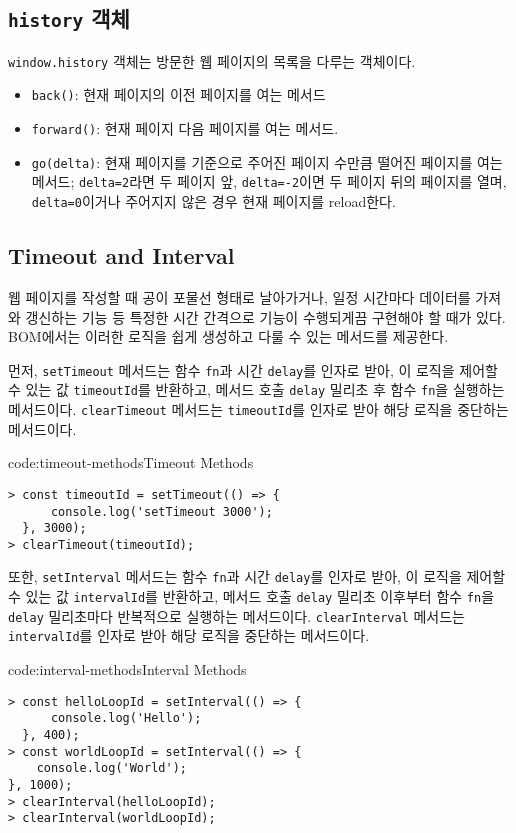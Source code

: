 \subsection*{\texttt{history} 객체}

\texttt{window.history} 객체는 방문한 웹 페이지의 목록을 다루는 객체이다.

\begin{itemize}
    \item \texttt{back()}: 현재 페이지의 이전 페이지를 여는 메서드
    \item \texttt{forward()}: 현재 페이지 다음 페이지를 여는 메서드. 
    \item \texttt{go(delta)}: 현재 페이지를 기준으로 주어진 페이지 수만큼 떨어진 페이지를 여는 메서드; \texttt{delta=2}라면 두 페이지 앞, \texttt{delta=-2}이면 두 페이지 뒤의 페이지를 열며, \texttt{delta=0}이거나 주어지지 않은 경우 현재 페이지를 reload한다.
\end{itemize}

\subsection*{Timeout and Interval}

웹 페이지를 작성할 때 공이 포물선 형태로 날아가거나, 일정 시간마다 데이터를 가져와 갱신하는 기능 등 특정한 시간 간격으로 기능이 수행되게끔 구현해야 할 때가 있다. BOM에서는 이러한 로직을 쉽게 생성하고 다룰 수 있는 메서드를 제공한다.

먼저, \texttt{setTimeout} 메서드는 함수 \texttt{fn}과 시간 \texttt{delay}를 인자로 받아, 이 로직을 제어할 수 있는 값 \texttt{timeoutId}를 반환하고, 메서드 호출 \texttt{delay} 밀리초 후 함수 \texttt{fn}을 실행하는 메서드이다. \texttt{clearTimeout} 메서드는 \texttt{timeoutId}를 인자로 받아 해당 로직을 중단하는 메서드이다.

\begin{codeenv}{code:timeout-methods}{Timeout Methods}\begin{verbatim}
> const timeoutId = setTimeout(() => {
      console.log('setTimeout 3000');
  }, 3000);
> clearTimeout(timeoutId);
\end{verbatim}
\end{codeenv}

또한, \texttt{setInterval} 메서드는 함수 \texttt{fn}과 시간 \texttt{delay}를 인자로 받아, 이 로직을 제어할 수 있는 값 \texttt{intervalId}를 반환하고, 메서드 호출 \texttt{delay} 밀리초 이후부터 함수 \texttt{fn}을 \texttt{delay} 밀리초마다 반복적으로 실행하는 메서드이다. \texttt{clearInterval} 메서드는 \texttt{intervalId}를 인자로 받아 해당 로직을 중단하는 메서드이다.

\begin{codeenv}{code:interval-methods}{Interval Methods}\begin{verbatim}
> const helloLoopId = setInterval(() => {
      console.log('Hello');
  }, 400);
> const worldLoopId = setInterval(() => {
    console.log('World');
}, 1000);
> clearInterval(helloLoopId);
> clearInterval(worldLoopId);
\end{verbatim}
\end{codeenv}

